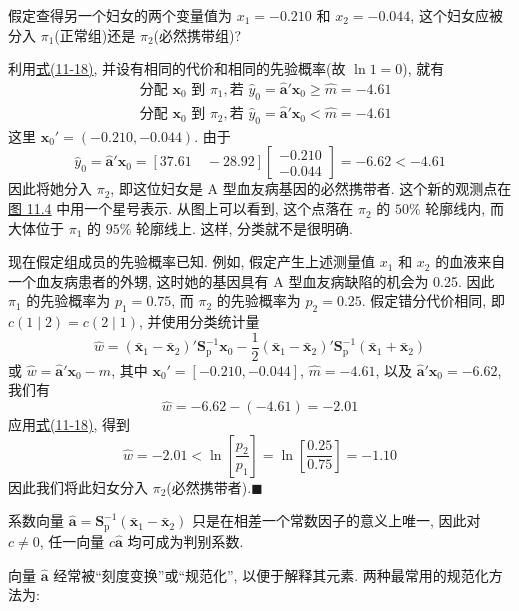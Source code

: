 
假定查得另一个妇女的两个变量值为 $x_1=-0.210$ 和 $x_2=-0.044$, 这个妇女应被分入 $\pi_1$(正常组)还是 $\pi_2$(必然携带组)?

利用\hyperref[eq:11-18]{式(11-18)}, 并设有相同的代价和相同的先验概率(故 $\ln 1=0$), 就有
\[
\begin{aligned}
&\text{分配 } \mathbf{x}_0 \text{ 到 } \pi_1, \text{若 } \hat{y}_0=\hat{\mathbf{a}}'\mathbf{x}_0\geqslant\hat{m}=-4.61\\[4pt]
&\text{分配 } \mathbf{x}_0 \text{ 到 } \pi_2, \text{若 } \hat{y}_0=\hat{\mathbf{a}}'\mathbf{x}_0<\hat{m}=-4.61
\end{aligned}
\]
这里 $\mathbf{x}_0'=(-0.210,-0.044)$. 由于
\[
\hat{y}_0=\hat{\mathbf{a}}'\mathbf{x}_0=[37.61\quad -28.92]\begin{bmatrix}-0.210\\-0.044\end{bmatrix}=-6.62<-4.61
\]
因此将她分入 $\pi_2$, 即这位妇女是 A 型血友病基因的必然携带者. 这个新的观测点在\hyperref[fig:11.4]{图 11.4} 中用一个星号表示. 从图上可以看到, 这个点落在 $\pi_2$ 的 $50\%$ 轮廓线内, 而大体位于 $\pi_1$ 的 $95\%$ 轮廓线上. 这样, 分类就不是很明确.

现在假定组成员的先验概率已知. 例如, 假定产生上述测量值 $x_1$ 和 $x_2$ 的血液来自一个血友病患者的外甥, 这时她的基因具有 A 型血友病缺陷的机会为 0.25. 因此 $\pi_1$ 的先验概率为 $p_1=0.75$, 而 $\pi_2$ 的先验概率为 $p_2=0.25$. 假定错分代价相同, 即 $c(1\mid2)=c(2\mid1)$, 并使用分类统计量
\[
\hat{w}=(\bar{\mathbf{x}}_1-\bar{\mathbf{x}}_2)'\mathbf{S}_{\mathrm{p}}^{-1}\mathbf{x}_0-\frac{1}{2}(\bar{\mathbf{x}}_1-\bar{\mathbf{x}}_2)'\mathbf{S}_{\mathrm{p}}^{-1}(\bar{\mathbf{x}}_1+\bar{\mathbf{x}}_2)
\]
或 $\hat{w}=\hat{\mathbf{a}}'\mathbf{x}_0-\hat{m}$, 其中 $\mathbf{x}_0'=[-0.210,-0.044]$, $\hat{m}=-4.61$, 以及 $\hat{\mathbf{a}}'\mathbf{x}_0=-6.62$, 我们有
\[
\hat{w}=-6.62-(-4.61)=-2.01
\]
应用\hyperref[eq:11-18]{式(11-18)}, 得到
\[
\hat{w}=-2.01<\ln\left[\frac{p_2}{p_1}\right]=\ln\left[\frac{0.25}{0.75}\right]=-1.10
\]
因此我们将此妇女分入 $\pi_2$(必然携带者).\hfill$\blacksquare$


系数向量 $\hat{\mathbf{a}}=\mathbf{S}_{\mathrm{p}}^{-1}(\bar{\mathbf{x}}_1-\bar{\mathbf{x}}_2)$ 只是在相差一个常数因子的意义上唯一, 因此对 $c\neq0$, 任一向量 $c\hat{\mathbf{a}}$ 均可成为判别系数.

向量 $\hat{\mathbf{a}}$ 经常被“刻度变换”或“规范化”, 以便于解释其元素. 两种最常用的规范化方法为:

